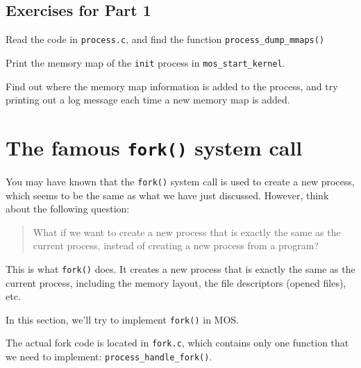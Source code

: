 \subsection{Exercises for Part 1}

\begin{exercise}
    \item Read the code in \texttt{process.c}, and find the function \texttt{process\_dump\_mmaps()}
    \item Print the memory map of the \texttt{init} process in \texttt{mos\_start\_kernel}.
    \item Find out where the memory map information is added to the process, and try
    printing out a log message each time a new memory map is added.
\end{exercise}

\section{The famous \texttt{fork()} system call}

You may have known that the \texttt{fork()} system call is used to create a new process, which
seems to be the same as what we have just discussed. However, think about the following
question:

\begin{quote}
    What if we want to create a new process that is exactly the same as the current process,
    instead of creating a new process from a program?
\end{quote}

This is what \texttt{fork()} does. It creates a new process that is exactly the same as the
current process, including the memory layout, the file descriptors (opened files), etc.

In this section, we'll try to implement \texttt{fork()} in MOS.

The actual fork code is located in \texttt{fork.c}, which contains only one function
that we need to implement: \texttt{process\_handle\_fork()}.

